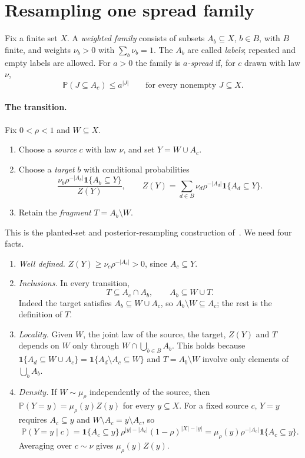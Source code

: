\documentclass[11pt]{article}
\numberwithin{equation}{section}
\newcommand{\PP}{\mathbb P}
\newcommand{\ind}{\mathbf 1}
\begin{document}
\section{Resampling one spread family}\label{sec:resampling}

Fix a finite set $X$. A \emph{weighted family} consists of subsets
$A_b\subseteq X$, $b\in B$, with $B$ finite, and weights $\nu_b>0$ with
$\sum_b\nu_b=1$. The $A_b$ are called \emph{labels}; repeated and empty labels
are allowed. For $a>0$ the family is \emph{$a$-spread} if, for $c$ drawn with
law $\nu$,
\begin{equation}\label{eq:spread}
 \PP(J\subseteq A_c)\le a^{|J|}\qquad\text{for every nonempty }J\subseteq X.
\end{equation}

\paragraph{The transition.} Fix $0<\rho<1$ and $W\subseteq X$.
\begin{enumerate}[label=\arabic*.,leftmargin=2em,itemsep=1pt]
 \item Choose a \emph{source} $c$ with law $\nu$, and set $Y=W\cup A_c$.
 \item Choose a \emph{target} $b$ with conditional probabilities
 \begin{equation}\label{eq:posterior}
  \frac{\nu_b\rho^{-|A_b|}\ind\{A_b\subseteq Y\}}{Z(Y)},
  \qquad
  Z(Y)=\sum_{d\in B}\nu_d\rho^{-|A_d|}\ind\{A_d\subseteq Y\}.
 \end{equation}
 \item Retain the \emph{fragment} $T=A_b\setminus W$.
\end{enumerate}
This is the planted-set and posterior-resampling construction
of~\cite[Sections~2.1--2.3]{MNSZ25}. We need four facts.
\begin{enumerate}[label=(F\arabic*),leftmargin=2.6em,itemsep=2pt]
\item \emph{Well defined.} $Z(Y)\ge\nu_c\rho^{-|A_c|}>0$, since $A_c\subseteq Y$.
\item \emph{Inclusions.} In every transition,
\begin{equation}\label{eq:two-inclusions}
 T\subseteq A_c\cap A_b,\qquad A_b\subseteq W\cup T.
\end{equation}
Indeed the target satisfies $A_b\subseteq W\cup A_c$, so
$A_b\setminus W\subseteq A_c$; the rest is the definition of $T$.
\item \emph{Locality.} Given $W$, the joint law of the source, the target,
$Z(Y)$ and $T$ depends on $W$ only through $W\cap\bigcup_{b\in B}A_b$. This
holds because $\ind\{A_d\subseteq W\cup A_c\}=\ind\{A_d\setminus A_c\subseteq W\}$
and $T=A_b\setminus W$ involve only elements of $\bigcup_bA_b$.
\item \emph{Density.} If $W\sim\mu_\rho$ independently of the source, then
$\PP(Y=y)=\mu_\rho(y)Z(y)$ for every $y\subseteq X$. For a fixed source $c$,
$Y=y$ requires $A_c\subseteq y$ and $W\setminus A_c=y\setminus A_c$, so
\[
 \PP(Y=y\mid c)=\ind\{A_c\subseteq y\}\,\rho^{|y|-|A_c|}(1-\rho)^{|X|-|y|}
 =\mu_\rho(y)\rho^{-|A_c|}\ind\{A_c\subseteq y\}.
\]
Averaging over $c\sim\nu$ gives $\mu_\rho(y)Z(y)$.
\end{enumerate}
\end{document}

